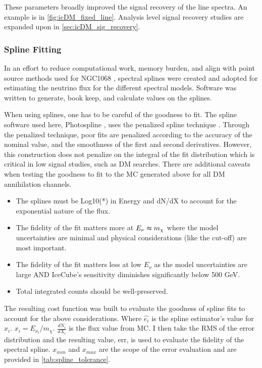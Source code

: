 These parameters broadly improved the signal recovery of the line spectra.
An example is in \cref{fig:icDM_fixed_line}.
Analysis level signal recovery studies are expanded upon in \cref{sec:icDM_sig_recovery}.

\subsubsection{Spline Fitting}\label{sec:icDM_splines}

In an effort to reduce computational work, memory burden, and align with point source methods used for NGC1068 \cite{IC_NGC1068}, spectral splines were created and adopted for estimating the neutrino flux for the different spectral models.
Software was written to generate, book keep, and calculate values on the splines.

When using splines, one has to be careful of the goodness to fit.
The spline software used here, Photospline \cite{photospline}, uses the penalized spline technique \cite{penalized_spline}.
Through the penalized technique, poor fits are penalized according to the accuracy of the nominal value, and the smoothness of the first and second derivatives.
However, this construction does not penalize on the integral of the fit distribution which is critical in low signal studies, such as DM searches.
There are additional caveats when testing the goodness to fit to the MC generated above for all DM annihilation channels.
\begin{itemize}
    \item The splines must be Log10(*) in Energy and dN/dX to account for the exponential nature of the flux.
    \item The fidelity of the fit matters more at $ E_\nu \thickapprox m_\chi $ where the model uncertainties are minimal and physical considerations (like the cut-off) are most important.
    \item The fidelity of the fit matters less at low $ E_\nu $ as the model uncertainties are large AND IceCube's sensitivity diminishes significantly below 500 GeV.
    \item Total integrated counts should be well-preserved.
\end{itemize}
The resulting cost function was built to evaluate the goodness of spline fits to account for the above considerations.
\erriSpline
Where $ \hat{e_i} $ is the spline estimator's value for $x_i$. $ x_i = E_{\nu_i} / m_\chi $. $ \frac{dN_i}{dX_i} $ is the flux value from MC.
I then take the RMS of the error distribution and the resulting value, err, is used to evaluate the fidelity of the spectral spline.
\MSEspline
$x_{min}$ and $x_{max}$ are the scope of the error evaluation and are provided in \cref{tab:spline_tolerance}.

